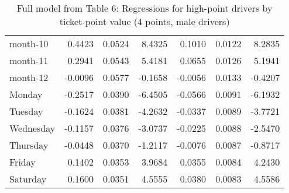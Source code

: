 \documentclass[10pt]{article}
\begin{document}
\begin{table}[ht]
\begin{tabular}{lrrrrrr}
  month-10 & 0.4423 & 0.0524 & 8.4325 & 0.1010 & 0.0122 & 8.2835 \\ 
  month-11 & 0.2941 & 0.0543 & 5.4181 & 0.0655 & 0.0126 & 5.1941 \\ 
  month-12 & -0.0096 & 0.0577 & -0.1658 & -0.0056 & 0.0133 & -0.4207 \\ 
  Monday & -0.2517 & 0.0390 & -6.4505 & -0.0566 & 0.0091 & -6.1932 \\ 
  Tuesday & -0.1624 & 0.0381 & -4.2632 & -0.0337 & 0.0089 & -3.7721 \\ 
  Wednesday & -0.1157 & 0.0376 & -3.0737 & -0.0225 & 0.0088 & -2.5470 \\ 
  Thursday & -0.0448 & 0.0370 & -1.2117 & -0.0076 & 0.0087 & -0.8717 \\ 
  Friday & 0.1402 & 0.0353 & 3.9684 & 0.0355 & 0.0084 & 4.2430 \\ 
  Saturday & 0.1600 & 0.0351 & 4.5555 & 0.0380 & 0.0083 & 4.5586 \\ 
   \hline
\end{tabular}
\caption{Full model from Table 6: Regressions for high-point drivers by ticket-point value (4 points, male drivers)} 
\label{tab_6_4_pts_no_age_M}
\end{table}


\clearpage
\pagebreak



\end{document}
